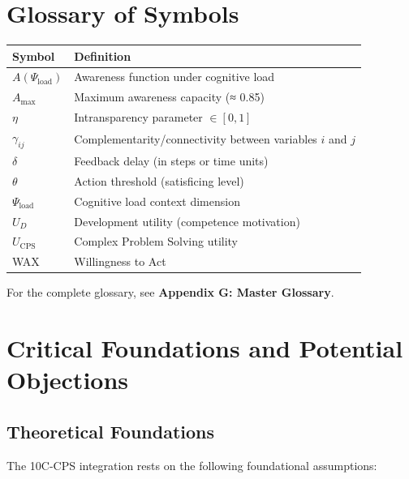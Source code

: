 
\section{Glossary of Symbols}
\label{sec:cps-glossary}

\begin{tabular}{ll}
\toprule
\textbf{Symbol} & \textbf{Definition} \\
\midrule
$A(\Psi_{\text{load}})$ & Awareness function under cognitive load \\
$A_{\max}$ & Maximum awareness capacity (≈ 0.85) \\
$\eta$ & Intransparency parameter $\in [0,1]$ \\
$\gamma_{ij}$ & Complementarity/connectivity between variables $i$ and $j$ \\
$\delta$ & Feedback delay (in steps or time units) \\
$\theta$ & Action threshold (satisficing level) \\
$\Psi_{\text{load}}$ & Cognitive load context dimension \\
$U_D$ & Development utility (competence motivation) \\
$U_{\text{CPS}}$ & Complex Problem Solving utility \\
WAX & Willingness to Act \\
\bottomrule
\end{tabular}

\vspace{1em}
For the complete glossary, see \textbf{Appendix G: Master Glossary}.



\section{Critical Foundations and Potential Objections}
\label{sec:cps-foundations}

\subsection{Theoretical Foundations}

The 10C-CPS integration rests on the following foundational assumptions:

